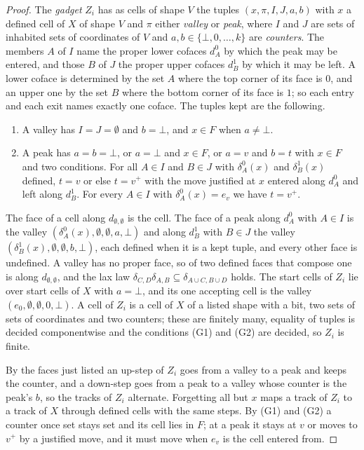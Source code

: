 \documentclass{lmcs}
\theoremstyle{definition}
\theoremstyle{remark}
\begin{document}
\begin{proof}
The \emph{gadget} $Z_i$ has as cells of shape $V$ the tuples $(x,\pi,I,J,a,b)$ with $x$ a defined cell of $X$ of shape
$V$ and $\pi$ either \emph{valley} or \emph{peak}, where $I$ and $J$ are sets of inhabited sets of coordinates of
$V$ and $a,b\in\{\bot,0,\dots,k\}$ are \emph{counters}. The members $A$
of $I$ name the proper lower cofaces $d^0_A$ by which the peak may be entered, and those $B$ of $J$ the proper upper
cofaces $d^1_B$ by which it may be left. A lower coface is determined by the set $A$ where the top corner of its face
is $0$, and an upper one by the set $B$ where the bottom corner of its face is $1$; so each entry and each exit names
exactly one coface. The tuples kept are the following.
\begin{enumerate}[label=(G\arabic*),nosep,leftmargin=*]
\item A valley has $I=J=\emptyset$ and $b=\bot$, and $x\in F$ when $a\neq\bot$.
\item A peak has $a=b=\bot$, or $a=\bot$ and $x\in F$, or $a=v$ and $b=t$ with $x\in F$ and two conditions. For all
  $A\in I$ and $B\in J$ with $\delta^0_A(x)$ and $\delta^1_B(x)$ defined, $t=v$ or else $t=v^+$ with the move
  justified at $x$ entered along $d^0_A$ and left along $d^1_B$. For every $A\in I$ with $\delta^0_A(x)=e_v$ we have
  $t=v^+$.
\end{enumerate}
The face of a cell along $d_{\emptyset,\emptyset}$ is the cell. The face of a peak along $d^0_A$ with $A\in I$ is
the valley $(\delta^0_A(x),\emptyset,\emptyset,a,\bot)$ and along $d^1_B$ with $B\in J$ the valley
$(\delta^1_B(x),\emptyset,\emptyset,b,\bot)$, each defined when it is a kept tuple, and every other face is
undefined.
A valley has no proper face, so of two defined faces that compose one is along $d_{\emptyset,\emptyset}$, and the
lax law $\delta_{C,D}\delta_{A,B}\subseteq\delta_{A\cup C,B\cup D}$ holds.
The start cells of $Z_i$ lie over start cells of $X$ with $a=\bot$, and its one accepting cell is the valley
$(e_0,\emptyset,\emptyset,0,\bot)$. A cell of $Z_i$ is a cell of
$X$ of a listed shape with a bit, two sets of sets of coordinates and two counters; these are finitely many,
equality of tuples is decided componentwise and the conditions (G1) and (G2) are decided, so $Z_i$ is
finite.

By the faces just listed an up-step of $Z_i$ goes from a valley to a peak and keeps the counter, and a down-step goes
from a peak to a valley whose counter is the peak's $b$,
so the tracks of $Z_i$ alternate. Forgetting all but $x$ maps a track of $Z_i$
to a track of $X$ through defined cells with the same steps.
By (G1) and (G2) a counter once set stays set and its cell lies in $F$; at a peak it
stays at $v$ or moves to $v^+$ by a justified move, and it must move when $e_v$ is the cell entered
from.


\end{proof}
\end{document}
